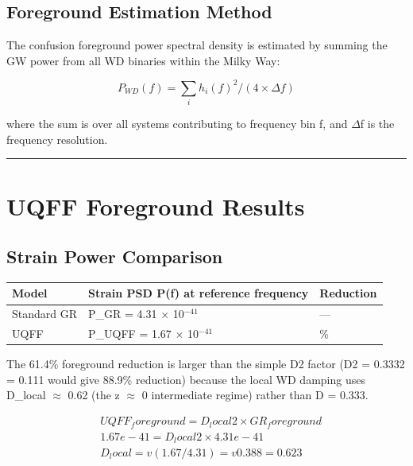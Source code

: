 \documentclass[12pt,a4paper]{article}
\begin{document}
\subsection{Foreground Estimation Method}

The confusion foreground power spectral density is estimated by summing the GW power from all WD binaries within the Milky Way:

\begin{equation}
P_{WD}(f) = \sum_i h_i(f)^2 / (4 \times \Delta f)
\end{equation}

where the sum is over all systems contributing to frequency bin f, and $\Delta$f is the frequency resolution.

\medskip\hrule\medskip

\section{UQFF Foreground Results}

\subsection{Strain Power Comparison}

\begin{table}[H]
\centering
\small
\begin{tabularx}{\linewidth}{@{}>{\raggedright\arraybackslash}X>{\raggedright\arraybackslash}X>{\raggedright\arraybackslash}X@{}}
\toprule
Model & Strain PSD P(f) at reference frequency & Reduction \tabularnewline
\midrule
Standard GR & P\_GR = 4.31 $\times$ 10$^{-41}$ & --- \tabularnewline
UQFF & P\_UQFF = 1.67 $\times$ 10$^{-41}$ & 61.4\% \tabularnewline
\bottomrule
\end{tabularx}
\end{table}

The 61.4\% foreground reduction is larger than the simple D2 factor (D2 = 0.3332 = 0.111 would give 88.9\% reduction) because the local WD damping uses D\_local $\approx$ 0.62 (the z $\approx$ 0 intermediate regime) rather than D = 0.333.

\begin{equation}
\begin{aligned}
  & UQFF_foreground = D_local2 \times GR_foreground \\
  & 1.67e-41 = D_local2 \times 4.31e-41 \\
  & D_local = v(1.67/4.31) = v0.388 = 0.623
\end{aligned}
\end{equation}
\end{document}
